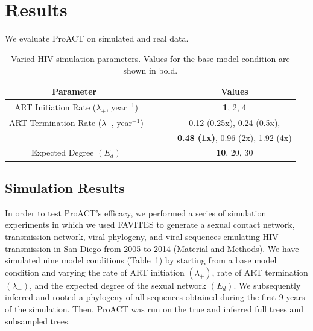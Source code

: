 \documentclass[oupdraft]{sysbio}
\begin{document}
\section{Results}
We evaluate ProACT on simulated and real data. 

\begin{table}[!t]
\begin{center}
\begin{tabular}{c c}
\toprule
\textbf{Parameter~~~~~~} & \textbf{Values}\\
\toprule
ART Initiation Rate ($\lambda_+$, year$^{-1}$)~~~~~~ & \textbf{1}, 2, 4\\
\hdashline
ART Termination Rate ($\lambda_-$, year$^{-1}$)~~~~~~ & 0.12 (0.25x), 0.24 (0.5x),\\
~~~~~~ & \textbf{0.48 (1x)}, 0.96 (2x), 1.92 (4x)\\
\hdashline
Expected Degree $\left(E_d\right)$~~~~~~ & \textbf{10}, 20, 30\\
\bottomrule
\end{tabular}
\end{center}
\caption{Varied HIV simulation parameters. Values for the base model condition are shown in bold.}
\label{tab:favites}
\end{table}

\subsection{Simulation Results}

In order to test ProACT's efficacy, we performed a series of simulation experiments in which we used FAVITES \citep{Moshiri2018} to generate a sexual contact network, transmission network, viral phylogeny, and viral sequences emulating HIV transmission in San Diego from 2005 to 2014 (Material and Methods).
We have simulated nine model conditions (Table~1) by starting from a base model condition and varying the rate of ART initiation $(\lambda_+)$, rate of ART termination $(\lambda_-)$, and the expected degree of the sexual network $(E_d)$.
We subsequently inferred and rooted a phylogeny of all sequences obtained during the first 9 years of the simulation.
Then, ProACT was run on the true and inferred full trees and subsampled trees.
\end{document}
